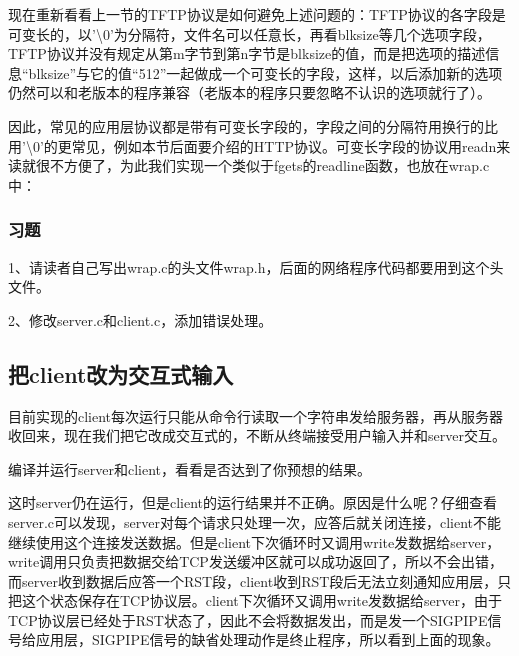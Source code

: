 现在重新看看上一节的TFTP协议是如何避免上述问题的：TFTP协议的各字段是可变长的，以'\textbackslash{}0'为分隔符，文件名可以任意长，再看blksize等几个选项字段，TFTP协议并没有规定从第m字节到第n字节是blksize的值，而是把选项的描述信息“blksize”与它的值“512”一起做成一个可变长的字段，这样，以后添加新的选项仍然可以和老版本的程序兼容（老版本的程序只要忽略不认识的选项就行了）。



因此，常见的应用层协议都是带有可变长字段的，字段之间的分隔符用换行的比用'\textbackslash{}0'的更常见，例如本节后面要介绍的HTTP协议。可变长字段的协议用readn来读就很不方便了，为此我们实现一个类似于fgets的readline函数，也放在wrap.\BookSplit{}c中：



\subsubsection*{习题}
%


1、请读者自己写出wrap.\BookSplit{}c的头文件wrap.\BookSplit{}h，后面的网络程序代码都要用到这个头文件。



2、修改server.\BookSplit{}c和client.\BookSplit{}c，添加错误处理。


\subsection{把client改为交互式输入}
%


目前实现的client每次运行只能从命令行读取一个字符串发给服务器，再从服务器收回来，现在我们把它改成交互式的，不断从终端接受用户输入并和server交互。




编译并运行server和client，看看是否达到了你预想的结果。




这时server仍在运行，但是client的运行结果并不正确。原因是什么呢？仔细查看server.\BookSplit{}c可以发现，server对每个请求只处理一次，应答后就关闭连接，client不能继续使用这个连接发送数据。但是client下次循环时又调用write发数据给server，write调用只负责把数据交给TCP发送缓冲区就可以成功返回了，所以不会出错，而server收到数据后应答一个RST段，client收到RST段后无法立刻通知应用层，只把这个状态保存在TCP协议层。client下次循环又调用write发数据给server，由于TCP协议层已经处于RST状态了，因此不会将数据发出，而是发一个SIGPIPE信号给应用层，SIGPIPE信号的缺省处理动作是终止程序，所以看到上面的现象。



